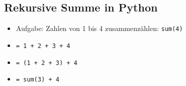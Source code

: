 \newcommand{\mytree}{
    \ifnum \val = 0
        \draw[draw=., ultra thick] (\x,\y) rectangle 	++(0.75,0.75);
        \node at (\x+0.375,\y+0.375) {f(\the\val)};
    \fi
    \ifnum \val = 1
        \draw[draw=., ultra thick] (\x,\y) rectangle 	++(0.75,0.75);
        \node at (\x+0.375,\y+0.375) {f(\the\val)};
    \fi
    \ifnum \val > 1

        \draw[draw=., ultra thick] (\x,\y) rectangle ++(0.75,0.75);
        \node at (\x+0.375,\y+0.375) {f(\the\val)};

        \advance \val -1
        \advance \y -2
        \tmp=-\val*0.01
        \advance \tmp -1

        \advance \x \tmp
        \draw [->, thick] (\x-\tmp,\y+2) -- (\x+0.75,\y+0.75);
        \mytree;

        \tmp=\val*0.01
        \advance \tmp 1

        \advance \x \tmp
        \advance \val -1
        \tmp=\val*0.01
        \advance \tmp 1

        \advance \x \tmp

        \draw [->, thick] (\x-\tmp+0.75,\y+2) -- (\x,\y+0.75);
        \mytree;

        \tmp=-\val*0.01
        \advance \tmp -1

        \advance \val +2
        \advance \x \tmp
        \advance \y +2
    \fi
}


\begin{frame}
    \slidehead
    \centering
    \vspace{-0.1cm}
\end{frame}



\subsection{Rekursive Summe in Python}
\begin{frame}
    \slidehead

    \begin{itemize}
        \item Aufgabe: Zahlen von 1 bis 4 zusammenzählen: \texttt{sum(4)} \pause
        \item \texttt{= 1 + 2 + 3 + 4} \pause
        \item \texttt{= (1 + 2 + 3) + 4} \pause
        \item \texttt{= sum(3) + 4}
    \end{itemize}
    \vspace{1em}
    \pause
\end{frame}


